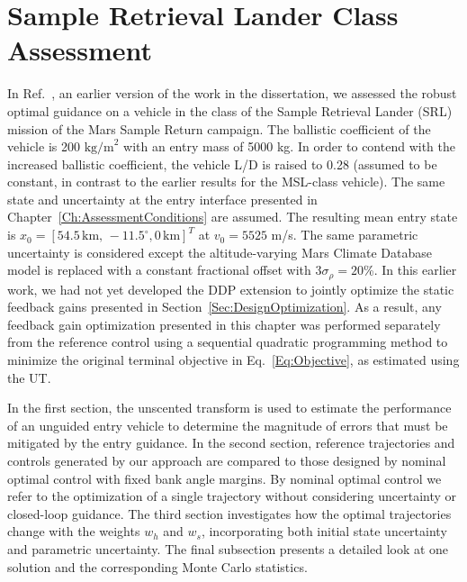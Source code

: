 \chapter{Sample Retrieval Lander Class Assessment}\label{Ch:SRL_EDL}
In Ref.~\cite{MyRobustOCPaper}, an earlier version of the work in the dissertation, we assessed the robust optimal guidance on a vehicle in the class of the Sample Retrieval Lander (SRL) mission of the Mars Sample Return campaign\cite{MSR,MSR2}. The ballistic coefficient of the vehicle is 200 $ \mathrm{kg/m}^2 $ with an entry mass of 5000 kg. In order to contend with the increased ballistic coefficient, the vehicle L/D is raised to 0.28 (assumed to be constant, in contrast to the earlier results for the MSL-class vehicle). The same state and uncertainty at the entry interface presented in Chapter~\ref{Ch:AssessmentConditions} are assumed. The resulting mean entry state is $x_0 = [54.5\,\mathrm{km},\,-11.5^{\circ}, 0\,\mathrm{km}]^T$ at $v_0 = 5525$ m/s. The same parametric uncertainty is considered except the altitude-varying Mars Climate Database model is replaced with a constant fractional offset with $3\sigma_{\rho} = 20$\%. In this earlier work, we had not yet developed the DDP extension to jointly optimize the static feedback gains presented in Section~\ref{Sec:DesignOptimization}. As a result, any feedback gain optimization presented in this chapter was performed separately from the reference control using a sequential quadratic programming method to minimize the original terminal objective in Eq.~\eqref{Eq:Objective}, as estimated using the UT.

In the first section, the unscented transform is used to estimate the performance of an unguided entry vehicle to determine the magnitude of errors that must be mitigated by the entry guidance. In the second section, reference trajectories and controls generated by our approach are compared to those designed by nominal optimal control with fixed bank angle margins. By nominal optimal control we refer to the optimization of a single trajectory without considering uncertainty or closed-loop guidance. The third section investigates how the optimal trajectories change with the weights $w_h$ and $w_s$, incorporating both initial state uncertainty and parametric uncertainty. The final subsection presents a detailed look at one solution and the corresponding Monte Carlo statistics.

